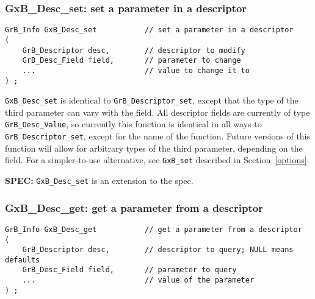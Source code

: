 \documentclass[12pt]{article}
\begin{document}
\newpage
\subsubsection{{\sf GxB\_Desc\_set:}  set a parameter in a descriptor}
\label{desc_set}

\begin{mdframed}[userdefinedwidth=6in]
{\footnotesize
\begin{verbatim}
GrB_Info GxB_Desc_set           // set a parameter in a descriptor
(
    GrB_Descriptor desc,        // descriptor to modify
    GrB_Desc_Field field,       // parameter to change
    ...                         // value to change it to
) ;
\end{verbatim} } \end{mdframed}

\verb'GxB_Desc_set' is identical to \verb'GrB_Descriptor_set', except that the
type of the third parameter can vary with the field.  All descriptor fields are
currently of type \verb'GrB_Desc_Value', so currently this function is
identical in all ways to \verb'GrB_Descriptor_set', except for the name of the
function.  Future versions of this function will allow for arbitrary types of
the third parameter, depending on the field.  For a simpler-to-use alternative,
see \verb'GxB_set' described in Section~\ref{options}.

\begin{spec}
{\bf SPEC:} \verb'GxB_Desc_set' is an extension to the spec.
\end{spec}

\subsubsection{{\sf GxB\_Desc\_get:}  get a parameter from a descriptor}
\label{desc_get}

\begin{mdframed}[userdefinedwidth=6in]
{\footnotesize
\begin{verbatim}
GrB_Info GxB_Desc_get           // get a parameter from a descriptor
(
    GrB_Descriptor desc,        // descriptor to query; NULL means defaults
    GrB_Desc_Field field,       // parameter to query
    ...                         // value of the parameter
) ;
\end{verbatim} } \end{mdframed}
\end{document}
